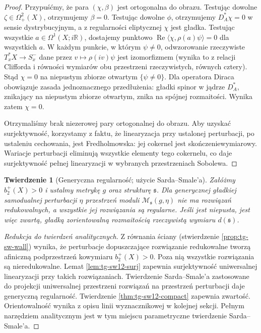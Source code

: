 \documentclass[11pt,a4paper]{report}
\numberwithin{equation}{section}
\theoremstyle{plain}
\newtheorem{twierdzenie}{Twierdzenie}[section]
\theoremstyle{definition}
\theoremstyle{remark}
\begin{document}
\begin{proof}
Przypuśćmy, że para $(\chi,\beta)$ jest ortogonalna
do obrazu. Testując dowolne $\zeta\in\Omega^2_+(X)$,
otrzymujemy $\beta=0$. Testując dowolne $\phi$,
otrzymujemy $D_A^*\chi=0$ w sensie dystrybucyjnym,
a z regularności eliptycznej $\chi$ jest gładka.
Testując wszystkie $a\in\Omega^1(X;i\mathbb R)$,
dostajemy punktowo
$\operatorname{Re}\langle\chi,\rho(a)\psi\rangle=0$
dla wszystkich $a$. W każdym punkcie, w którym $\psi\ne0$,
odwzorowanie rzeczywiste
$T_x^*X\to S_x^-$ dane przez $v\mapsto\rho(iv)\psi$
jest izomorfizmem (wynika to z relacji Clifforda i równości
wymiarów obu przestrzeni rzeczywistych, równych cztery).
Stąd $\chi=0$ na niepustym zbiorze otwartym
$\{\psi\ne0\}$. Dla operatora Diraca obowiązuje
zasada jednoznacznego przedłużenia: gładki spinor w jądrze
$D_A^*$, znikający na niepustym zbiorze otwartym,
znika na spójnej rozmaitości. Wynika zatem $\chi=0$.

Otrzymaliśmy brak niezerowej pary ortogonalnej do obrazu.
Aby uzyskać surjektywność, korzystamy z faktu, że
linearyzacja przy ustalonej perturbacji, po ustaleniu
cechowania, jest Fredholmowska: jej cokernel jest
skończeniewymiarowy. Wariacje perturbacji eliminują
wszystkie elementy tego cokernelu, co daje surjektywność
pełnej linearyzacji w wybranych przestrzeniach Sobolewa.
\end{proof}

\begin{twierdzenie}[Generyczna regularność; użycie Sarda--Smale'a]
\label{thm:tg-sw12-regular}
Załóżmy $b_2^+(X)>0$ i ustalmy metrykę $g$ oraz
strukturę $\mathfrak s$. Dla generycznej gładkiej
samodualnej perturbacji $\eta$ przestrzeń moduli
$\mathcal M_{\mathfrak s}(g,\eta)$ nie ma rozwiązań
redukowalnych, a wszystkie jej rozwiązania są regularne.
Jeśli jest niepusta, jest więc zwartą, gładką
zorientowalną rozmaitością rzeczywistą wymiaru
$d(\mathfrak s)$.
\end{twierdzenie}

\begin{proof}[Redukcja do twierdzeń analitycznych]
Z równania ściany (stwierdzenie \ref{prop:tg-sw-wall})
wynika, że perturbacje dopuszczające rozwiązanie
redukowalne tworzą afiniczną podprzestrzeń kowymiaru
$b_2^+(X)>0$. Poza nią wszystkie rozwiązania są
nieredukowalne. Lemat \ref{lem:tg-sw12-surj} zapewnia
surjektywność uniwersalnej linearyzacji przy takich
rozwiązaniach. Twierdzenie Sarda--Smale'a zastosowane
do projekcji uniwersalnej przestrzeni rozwiązań
na przestrzeń perturbacji daje generyczną regularność.
Twierdzenie \ref{thm:tg-sw12-compact} zapewnia zwartość.
Orientowalność wynika z opisu linii wyznacznikowej
w kolejnej sekcji. Pełnym narzędziem analitycznym jest
w tym miejscu parametryczne twierdzenie Sarda--Smale'a.
\end{proof}
\end{document}
